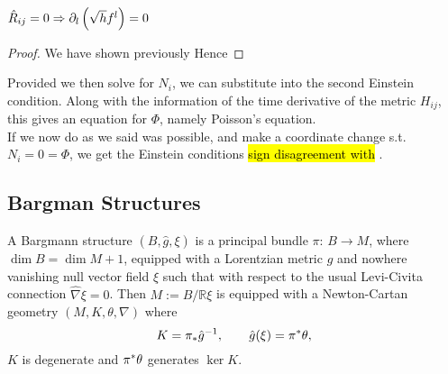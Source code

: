 \documentclass{article}
\begin{document}
\begin{lemma} $\hat{R}_{ij}=0 \Rightarrow \partial_l \left( \sqrt{h}f^l \right) = 0 $
\end{lemma}
\begin{proof}
We have shown previously 
Hence 
\end{proof}
Provided we then solve for $N_i$, we can substitute into the second Einstein condition. Along with the information of the time derivative of the metric $H_{ij}$, this gives an equation for $\Phi$, namely Poisson's equation. \\
If we now do as we said was possible, and make a coordinate change s.t. $N_i = 0 = \Phi$, we get the Einstein conditions 
\hl{sign disagreement with }\cite{Brinkmann1925}.
\subsection{Bargman Structures}
A Bargmann structure $(B, \hat g, \xi)$ is a principal bundle $\pi:\, B\rightarrow M$, where $\dim B=\dim M+1$,
equipped with a Lorentzian metric $\hat g$ and nowhere vanishing null vector field $\xi$ such that with respect to the usual Levi-Civita connection $\hat \nabla \xi=0$. Then $M:=B/\mathbb{R}\xi$ is equipped with
a Newton-Cartan geometry $(M, K, \theta, \nabla)$ where
$$ K=\pi_\ast {\hat g}\sp{-1}, \qquad \hat g(\xi)=\pi\sp\ast\theta,$$
$K$ is degenerate and $\pi\sp\ast\theta$ generates $\ker K$.
\end{document}

